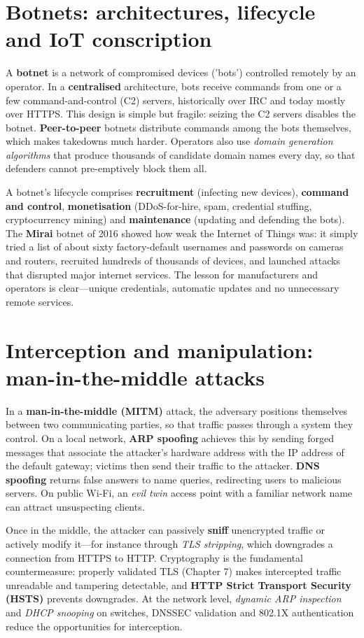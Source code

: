 \documentclass[11pt,openany]{book}
\begin{document}
\section{Botnets: architectures, lifecycle and IoT conscription}\label{sec:6.2}
A \textbf{botnet} is a network of compromised devices ('bots') controlled remotely by an operator. In a \textbf{centralised} architecture, bots receive commands from one or a few command-and-control (C2) servers, historically over IRC and today mostly over HTTPS. This design is simple but fragile: seizing the C2 servers disables the botnet. \textbf{Peer-to-peer} botnets distribute commands among the bots themselves, which makes takedowns much harder. Operators also use \emph{domain generation algorithms} that produce thousands of candidate domain names every day, so that defenders cannot pre-emptively block them all.

A botnet's lifecycle comprises \textbf{recruitment} (infecting new devices), \textbf{command and control}, \textbf{monetisation} (DDoS-for-hire, spam, credential stuffing, cryptocurrency mining) and \textbf{maintenance} (updating and defending the bots). The \textbf{Mirai} botnet of 2016 showed how weak the Internet of Things was: it simply tried a list of about sixty factory-default usernames and passwords on cameras and routers, recruited hundreds of thousands of devices, and launched attacks that disrupted major internet services. The lesson for manufacturers and operators is clear—unique credentials, automatic updates and no unnecessary remote services.

\section{Interception and manipulation: man-in-the-middle attacks}\label{sec:6.3}
In a \textbf{man-in-the-middle (MITM)} attack, the adversary positions themselves between two communicating parties, so that traffic passes through a system they control. On a local network, \textbf{ARP spoofing} achieves this by sending forged messages that associate the attacker's hardware address with the IP address of the default gateway; victims then send their traffic to the attacker. \textbf{DNS spoofing} returns false answers to name queries, redirecting users to malicious servers. On public Wi-Fi, an \emph{evil twin} access point with a familiar network name can attract unsuspecting clients.

Once in the middle, the attacker can passively \textbf{sniff} unencrypted traffic or actively modify it—for instance through \emph{TLS stripping}, which downgrades a connection from HTTPS to HTTP. Cryptography is the fundamental countermeasure: properly validated TLS (Chapter 7) makes intercepted traffic unreadable and tampering detectable, and \textbf{HTTP Strict Transport Security (HSTS)} prevents downgrades. At the network level, \emph{dynamic ARP inspection} and \emph{DHCP snooping} on switches, DNSSEC validation and 802.1X authentication reduce the opportunities for interception.
\end{document}
